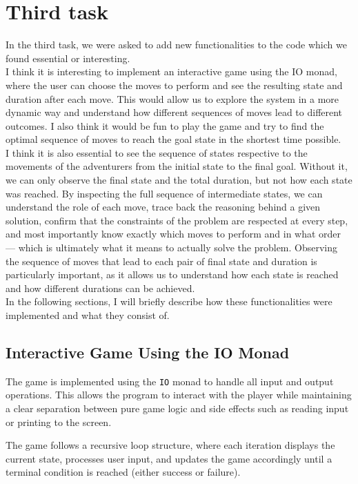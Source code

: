 \documentclass[a4paper,12pt]{report}
\begin{document}
\chapter{Third task}
In the third task, we were asked to add new functionalities to the code
which we found essential or interesting.
\\[1em]
I think it is interesting to implement an interactive game using
the IO monad, where the user can choose the moves to perform and see the
resulting state and duration after each move. This would allow us to
explore the system in a more dynamic way and understand how different
sequences of moves lead to different outcomes. I also think it
would be fun to play the game and try to find the optimal sequence
of moves to reach the goal state in the shortest time possible.
\\[1em]
I think it is also essential to see the sequence of states respective
to the movements of the
adventurers from the initial state to the final goal. Without it,
we can only observe the
final state and the total duration, but not how each
state was reached. By inspecting the
full sequence of intermediate states, we can understand the
role of each move, trace back
the reasoning behind a given solution, confirm that the constraints of
the problem are
respected at every step, and most importantly know exactly which
moves to perform and
in what order — which is ultimately what it means to actually solve the problem.
Observing the sequence of moves that lead to each
pair of final state and duration is particularly important, as it allows
us to understand how each state is reached and how different durations can
be achieved.
\\[1em]
In the following sections, I will briefly describe how these
functionalities were implemented and what they consist of.
\section{Interactive Game Using the IO Monad}

The game is implemented using the \texttt{IO} monad to handle all input and output operations. This allows the program to interact with the player while maintaining a clear separation between pure game logic and side effects such as reading input or printing to the screen.

The game follows a recursive loop structure, where each iteration displays the current state, processes user input, and updates the game accordingly until a terminal condition is reached (either success or failure).
\end{document}
